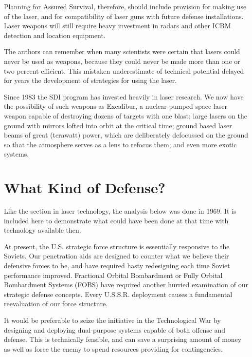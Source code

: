 Planning for Assured Survival, therefore, should include provision for making use of the laser, and for compatibility of laser guns with future defense installations. Laser weapons will still require heavy investment in radars and other ICBM detection and location equipment.

\begin{mdframed}[backgroundcolor=black!10]
The authors can remember when many scientists were certain that lasers could never be used as weapons, because they could never be made more than one or two percent efficient. This mistaken underestimate of technical potential delayed for years the development of strategies for using the laser.

Since 1983 the SDI program has invested heavily in laser research. We now have the possibility of such weapons as Excalibur, a nuclear-pumped space laser weapon capable of destroying dozens of targets with one blast; large lasers on the ground with mirrors lofted into orbit at the critical time; ground based laser beams of great (terawatt) power, which are deliberately defocussed on the ground so that the atmosphere serves as a lens to refocus them; and even more exotic systems.
\end{mdframed}

\section{What Kind of Defense?}

\begin{mdframed}[backgroundcolor=black!10]
Like the section in laser technology, the analysis below was done in 1969. It is included here to demonstrate what could have been done at that time with technology available then.
\end{mdframed}

At present, the U.S. strategic force structure is essentially responsive to the Soviets. Our penetration aids are designed to counter what we believe their defensive forces to be, and have required hasty redesigning each time Soviet performance improved. Fractional Orbital Bombardment or Fully Orbital Bombardment Systems (FOBS) have required another hurried examination of our strategic defense concepts. Every U.S.S.R. deployment causes a fundamental reevaluation of our force structure.

It would be preferable to seize the initiative in the Technological War by designing and deploying dual-purpose systems capable of both offense and defense. This is technically feasible, and can save a surprising amount of money as well as force the enemy to spend resources providing for contingencies.


